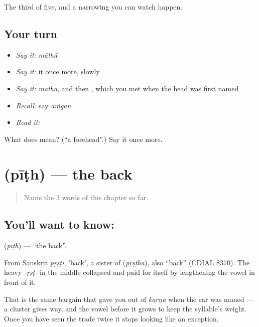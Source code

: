 \begin{grammarlens}[title={What you've built}]
The third of five, and a narrowing you can watch happen.
\end{grammarlens}

\subsection*{Your turn}
\begin{itemize}
\raggedright
  \item \emph{Say it:} \emph{māthā}
  \item \emph{Say it:} it once more, slowly
  \item \emph{Say it:} \emph{māthā}, and then , which you met when the head was first named
  \item \emph{Recall:} say \emph{āṁgan}
  \item \emph{Read it:} \textbf{}
\end{itemize}

\begin{tcolorbox}[breakable,colback=teal!4,colframe=teal!35!black,title={Before you move on}]
What does  mean? (\textquotedblleft{}a forehead\textquotedblright{}.) Say it once more.
\end{tcolorbox}
\section[\texorpdfstring{\hi{पीठ} (pīṭh)}{पीठ (pīṭh)}]{ (pīṭh) — the back}

\label{lesson:HI-C53-back}



\begin{quote}
Name the 3 words of this chapter so far.
\end{quote}

\subsection*{You'll want to know: }
\textbf{} (\emph{pīṭh}) — \textquotedblleft{}the back\textquotedblright{}.

From Sanskrit \emph{pṛṣṭi}, 'back', a sister of  (\emph{pṛṣṭha}), also \textquotedblleft{}back\textquotedblright{} (CDIAL 8370). The heavy \emph{-ṛṣṭ-} in the middle collapsed and paid for itself by lengthening the vowel in front of it.

That is the same bargain that gave you  out of \emph{karṇa} when the ear was named — a cluster gives way, and the vowel before it grows to keep the syllable's weight. Once you have seen the trade twice it stops looking like an exception.

